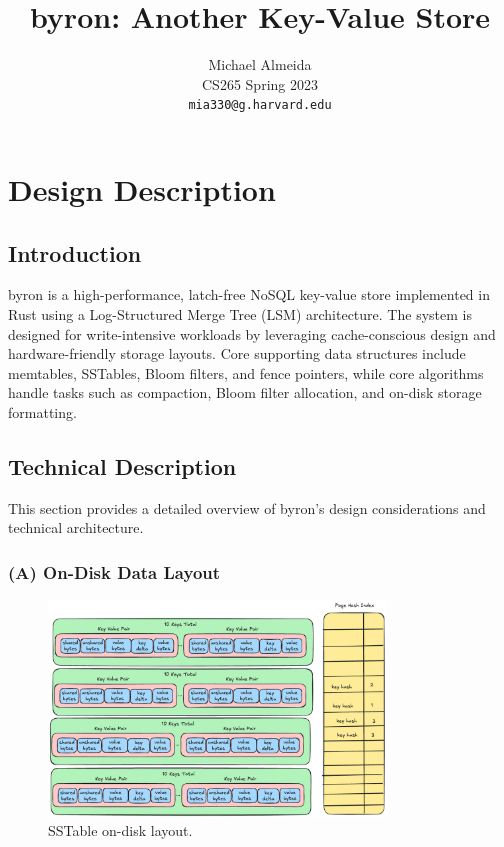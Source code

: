 \documentclass[10pt]{article}
\title{\bfseries byron: Another Key-Value Store}
\author{%
  Michael Almeida\\
  \small CS265 Spring 2023\\
  \texttt{mia330@g.harvard.edu}%
}
\date{} %
\begin{document}
\maketitle

\section{Design Description}

\subsection{Introduction}
byron is a high-performance, latch-free NoSQL key-value store implemented in Rust using a Log-Structured Merge Tree (LSM) architecture. The system is designed for write-intensive workloads by leveraging cache-conscious design and hardware-friendly storage layouts. Core supporting data structures include memtables, SSTables, Bloom filters, and fence pointers, while core algorithms handle tasks such as compaction, Bloom filter allocation, and on-disk storage formatting.

\subsection{Technical Description}
This section provides a detailed overview of byron’s design considerations and technical architecture.

\subsubsection*{(A) On-Disk Data Layout}
\begin{figure}[htbp]
  \centering
  \includegraphics[width=0.8\textwidth]{sstable_full.png}
  \caption{SSTable on-disk layout.}\label{fig:SSTable}
\end{figure}
\end{document}
